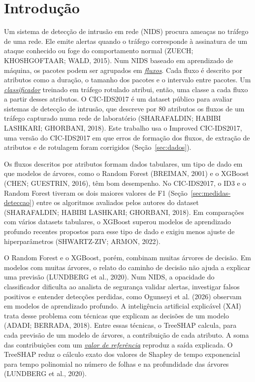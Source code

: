 \documentclass[
  12pt,
  oneside,
  a4paper,
  chapter=TITLE,
  sumario=tradicional,
  english,
  brazil
]{abntex2}
\newcommand{\termo}[2]{\hyperref[gl:#1]{\emph{#2}}}
\begin{document}
\tableofcontents*
\cleardoublepage

\textual

\chapter{Introdução}
\label{cap:introducao}

Um sistema de detecção de intrusão em rede (NIDS) procura ameaças no tráfego de uma rede. Ele emite
alertas quando o tráfego corresponde à assinatura de um ataque conhecido ou foge do comportamento
normal (ZUECH; KHOSHGOFTAAR; WALD, 2015). Num NIDS baseado em aprendizado de máquina, os pacotes
podem ser agrupados em \termo{fluxo}{fluxos}. Cada fluxo é descrito por atributos como a duração, o
tamanho dos pacotes e o intervalo entre pacotes. Um \termo{classificador}{classificador} treinado em
tráfego rotulado atribui, então, uma classe a cada fluxo a partir desses atributos. O CIC-IDS2017 é
um dataset público para avaliar sistemas de detecção de intrusão, que descreve por 80 atributos os
fluxos de um tráfego capturado numa rede de laboratório (SHARAFALDIN; HABIBI LASHKARI; GHORBANI,
2018). Este trabalho usa o Improved CIC-IDS2017, uma versão do CIC-IDS2017 em que erros de formação
dos fluxos, de extração de atributos e de rotulagem foram corrigidos (Seção~\ref{sec:dados}).

Os fluxos descritos por atributos formam dados tabulares, um tipo de dado em que modelos de árvores, como o Random Forest
(BREIMAN, 2001) e o XGBoost (CHEN; GUESTRIN, 2016), têm bom desempenho. No CIC-IDS2017, o ID3 e o
Random Forest tiveram os dois maiores valores de F1 (Seção~\ref{sec:medidas-deteccao}) entre os
algoritmos avaliados pelos autores do dataset (SHARAFALDIN; HABIBI LASHKARI; GHORBANI, 2018). Em
comparações com vários datasets tabulares, o XGBoost superou modelos de aprendizado profundo
recentes propostos para esse tipo de dado e exigiu menos ajuste de hiperparâmetros (SHWARTZ-ZIV;
ARMON, 2022).

O Random Forest e o XGBoost, porém, combinam muitas árvores de decisão. Em modelos com muitas
árvores, o relato do caminho de decisão não ajuda a explicar uma previsão (LUNDBERG et al., 2020).
Num NIDS, a opacidade do classificador dificulta ao analista de segurança validar alertas,
investigar falsos positivos e entender detecções perdidas, como Ogunseyi et al. (2026) observam em
modelos de aprendizado profundo. A inteligência artificial explicável (XAI) trata desse problema
com técnicas que explicam as decisões de um modelo (ADADI; BERRADA, 2018). Entre essas técnicas, o
TreeSHAP calcula, para cada previsão de um modelo de árvores, a contribuição de cada atributo. A
soma das contribuições com um \termo{valor-referencia}{valor de referência} reproduz a saída
explicada. O TreeSHAP reduz o cálculo exato dos valores de Shapley de tempo exponencial para tempo
polinomial no número de folhas e na profundidade das árvores (LUNDBERG et al., 2020).
\end{document}
